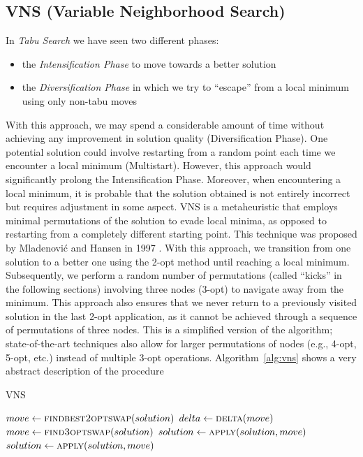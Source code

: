 \documentclass{article}
\begin{document}
\subsection{VNS (Variable Neighborhood Search)}
In \textit{Tabu Search} we have seen two different phases:
\begin{itemize}
        \item the \textit{Intensification Phase} to move towards a better solution
        \item the \textit{Diversification Phase} in which we try to ``escape'' from a local minimum using only
        non-tabu moves
\end{itemize}
With this approach, we may spend a considerable amount of time without achieving any improvement in
solution quality (Diversification Phase). One potential solution could involve restarting from a random
point each time we encounter a local minimum (Multistart). However, this approach would significantly
prolong the Intensification Phase. Moreover, when encountering a local minimum, it is probable
that the solution obtained is not entirely incorrect but requires adjustment in some aspect.
VNS is a metaheuristic that employs minimal permutations of the solution to evade local minima, as
opposed to restarting from a completely different starting point.
This technique was proposed by Mladenovi{\'c} and Hansen in 1997 \cite{mladenovic1997variable}.
With this approach, we transition from one solution to a better one using the 2-opt method until reaching
a local minimum. Subsequently, we perform a random number of permutations (called ``kicks'' in the following sections)
involving three nodes (3-opt) to navigate away from the minimum.
This approach also ensures that we never return to a previously visited
solution in the last 2-opt application, as it cannot be achieved through a sequence of permutations of
three nodes.
This is a simplified version of the algorithm; state-of-the-art techniques also allow for larger permutations
of nodes (e.g., 4-opt, 5-opt, etc.) instead of multiple 3-opt operations.
Algorithm~\ref{alg:vns} shows a very abstract description of the procedure

\begin{algorithm}[ht]
\caption{VNS}
\label{alg:vns}
\begin{algorithmic}
        \State{}
                \State $move \gets \Call{findbest2optswap}{solution}$
                \State $delta \gets \Call{delta}{move}$
                                \State $move \gets \Call{find3optswap}{solution}$
                                \State $solution \gets \Call{apply}{solution, move}$
                        \EndFor
                \Else
                        \State $solution \gets \Call{apply}{solution, move}$
                \EndIf
        \EndWhile
\EndProcedure
\end{algorithmic}
\end{algorithm}
\end{document}
